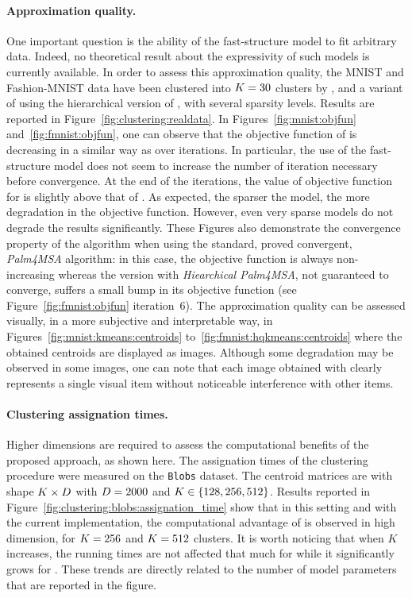 \paragraph{Approximation quality.} One important question is the ability of the fast-structure model to fit arbitrary data.
Indeed, no theoretical result about the expressivity of such models is currently available.
In order to assess this approximation quality, the MNIST and Fashion-MNIST data have been clustered into $K=30$ clusters by \kmeans, \qkmeans and a variant of \qkmeans using the hierarchical version of \palm, with several sparsity levels.
Results are reported in Figure~\ref{fig:clustering:realdata}.
In Figures~\ref{fig:mnist:objfun} and~\ref{fig:fmnist:objfun}, one can observe that the objective function of \qkmeans is decreasing in a similar way as \kmeans over iterations.
In particular, the use of the fast-structure model does not seem to increase the number of iteration necessary before convergence.
At the end of the iterations, the value of objective function for \qkmeans is slightly above that of \kmeans.
As expected, the sparser the model, the more degradation in the objective function.
However, even very sparse models do not degrade the results significantly. These Figures also demonstrate the convergence property of the \qkmeans algorithm when using the standard, proved convergent, \textit{Palm4MSA} algorithm: in this case, the objective function is always non-increasing whereas the \qkmeans version with \textit{Hiearchical Palm4MSA}, not guaranteed to converge, suffers a small bump in its objective function (see Figure~\ref{fig:fmnist:objfun} iteration~6).
The approximation quality can be assessed visually, in a more subjective and interpretable way, in Figures~\ref{fig:mnist:kmeans:centroids} to~\ref{fig:fmnist:hqkmeans:centroids} where the obtained centroids are displayed as images.
Although some degradation may be observed in some images, one can note that each image obtained with \qkmeans clearly represents a single visual item without noticeable interference with other items.

\paragraph{Clustering assignation times.}
Higher dimensions are required to assess the computational benefits of the proposed approach, as shown here.
The assignation times of the clustering procedure were measured on the \texttt{Blobs} dataset.
The centroid matrices are with shape $K \times D$ with $D=2000$  and $K\in\left \lbrace 128, 256, 512\right \rbrace$.
Results reported in Figure~\ref{fig:clustering:blobs:assignation_time} show that in this setting and with the current implementation, the computational advantage of \qkmeans is observed in high dimension, for $K=256$ and $K=512$ clusters. It is worth noticing that when $K$ increases, the running times are not affected that much for \qkmeans while it significantly grows for \kmeans. These trends are directly related to the number of model parameters that are reported in the figure.


